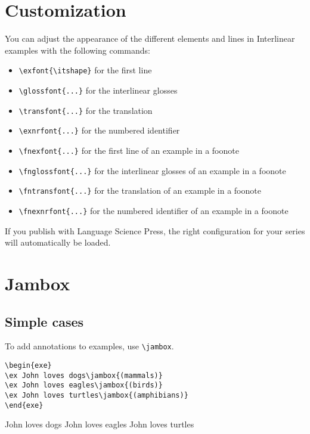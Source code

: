 \documentclass[output=guidelines]{langscibook}
\newcommand{\cmd}[1]{\texttt{\textbackslash#1}}
\begin{document}
\section{Customization}
You can adjust the appearance of the different elements and lines in Interlinear examples with the following commands:
\begin{itemize}
\item  \cmd{exfont\{\textbackslash itshape\}} for the first line
\item  \cmd{glossfont\{...\}} for the interlinear glosses 
\item  \cmd{transfont\{...\}} for the translation 
\item  \cmd{exnrfont\{...\}} for the numbered identifier
\medskip 
\item  \cmd{fnexfont\{...\}} for the first line of an example in a foonote
\item  \cmd{fnglossfont\{...\}} for the interlinear glosses of an example in a foonote
\item  \cmd{fntransfont\{...\}} for the translation of an example in a foonote
\item  \cmd{fnexnrfont\{...\}} for the numbered identifier of an example in a foonote
\end{itemize}
    
If you publish with Language Science Press, the right configuration for your series will automatically be loaded.

 
\section{Jambox}
\subsection{Simple cases}
To add annotations to examples, use \cmd{jambox}.


\begin{lstlisting}
\begin{exe}
\ex John loves dogs\jambox{(mammals)}
\ex John loves eagles\jambox{(birds)}
\ex John loves turtles\jambox{(amphibians)}   
\end{exe}
 \end{lstlisting}
 
\begin{exe}
\ex John loves dogs
\ex John loves eagles
\ex John loves turtles   
\end{exe}  
\end{document}
